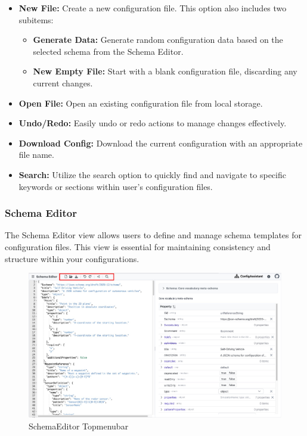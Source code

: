 \begin{itemize}
    \item \textbf{New File:} Create a new configuration file. This option also includes two subitems:
    \begin{itemize}
        \item \textbf{Generate Data:} Generate random configuration data based on the selected schema from the Schema Editor.
        \item \textbf{New Empty File:} Start with a blank configuration file, discarding any current changes.
    \end{itemize}
\end{itemize}

\begin{itemize}
    \item \textbf{Open File:} Open an existing configuration file from local storage.
\end{itemize}
\begin{itemize}
    \item \textbf{Undo/Redo:} Easily undo or redo actions to manage changes effectively.
\end{itemize}
\begin{itemize}
    \item \textbf{Download Config:} Download the current configuration with an appropriate file name.
\end{itemize}
\begin{itemize}
    \item \textbf{Search:} Utilize the search option to quickly find and navigate to specific keywords or sections within user's configuration files.
\end{itemize}

\subsubsection{Schema Editor}

The Schema Editor view allows users to define and manage schema templates for configuration files. 
This view is essential for maintaining consistency and structure within your configurations. 

\begin{figure}[h]
    \includegraphics[width=3.5 in]{figures/Schemaeditor Topmenubar}
    \caption{SchemaEditor Topmenubar}
\end{figure}

